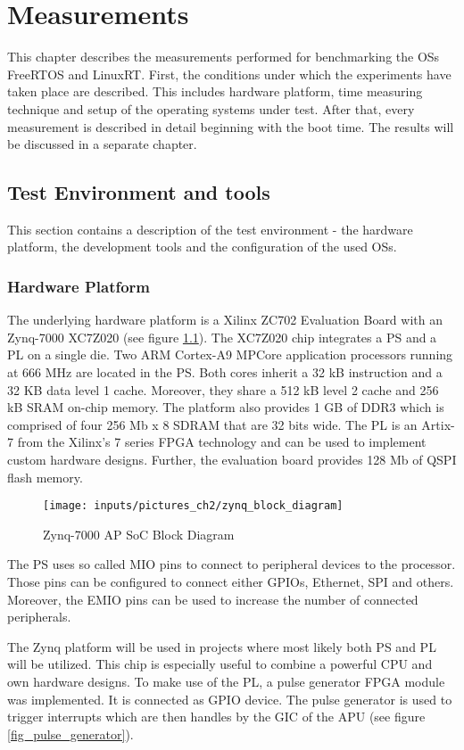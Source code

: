 \chapter{Measurements}\label{ch_measurements}
This chapter describes the measurements performed for benchmarking the \acp{OS} FreeRTOS and LinuxRT.
First, the conditions under which the experiments have taken place are described.
This includes hardware platform, time measuring technique and setup of the operating systems under test.
After that, every measurement is described in detail beginning with the boot time.
The results will be discussed in a separate chapter.

\section{Test Environment and tools}
This section contains a description of the test environment - the hardware platform, the development tools and the configuration of the used \acp{OS}.
\subsection{Hardware Platform}
The underlying hardware platform is a Xilinx ZC702 Evaluation Board \cite{xilinx:zc702_ev_board} with an Zynq-7000 XC7Z020 \cite{xilinx:zynq7000} (see figure \ref{fig_zynq_block_diagram}).
The XC7Z020 chip integrates a \ac{PS} and a \ac{PL} on a single die.
Two ARM Cortex-A9 MPCore application processors running at 666 MHz are located in the \ac{PS}.
Both cores inherit a 32 kB instruction and a 32 KB data level 1 cache.
Moreover, they share a 512 kB level 2 cache and 256 kB SRAM on-chip memory.
The platform also provides 1 GB of DDR3 which is comprised of four 256 Mb x 8 SDRAM that are 32 bits wide. 
The \ac{PL} is an Artix-7 from the Xilinx's 7 series \ac{FPGA} technology and can be used to implement custom hardware designs.
Further, the evaluation board provides 128 Mb of \ac{QSPI} flash memory.

\begin{figure}[htb]
		\begin{center}
			\texttt{[image: inputs/pictures\_ch2/zynq\_block\_diagram]}
			\caption[Zynq-7000 AP SoC Block Diagram]{Zynq-7000 AP SoC Block Diagram \cite{xilinx:zc702_ev_board}} \label{fig_zynq_block_diagram}
		\end{center}
\end{figure} 

The \ac{PS} uses so called \ac{MIO} pins to connect to peripheral devices to the processor.
Those pins can be configured to connect either \acp{GPIO}, Ethernet, \ac{SPI} and others.
Moreover, the \ac{EMIO} pins can be used to increase the number of connected peripherals.
\par
The Zynq platform will be used in projects where most likely both \ac{PS} and \ac{PL} will be utilized.
This chip is especially useful to combine a powerful \ac{CPU} and own hardware designs.
To make use of the \ac{PL}, a pulse generator \ac{FPGA} module was implemented.
It is connected as \ac{GPIO} device.
The pulse generator is used to trigger interrupts which are then handles by the \ac{GIC} of the \ac{APU} (see figure \ref{fig_pulse_generator}). 

